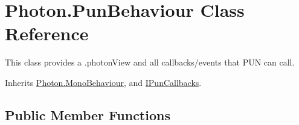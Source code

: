 \hypertarget{class_photon_1_1_pun_behaviour}{}\section{Photon.\+Pun\+Behaviour Class Reference}
\label{class_photon_1_1_pun_behaviour}


This class provides a .photon\+View and all callbacks/events that P\+UN can call.  




Inherits \hyperlink{class_photon_1_1_mono_behaviour}{Photon.\+Mono\+Behaviour}, and \hyperlink{interface_i_pun_callbacks}{I\+Pun\+Callbacks}.

\subsection*{Public Member Functions}

